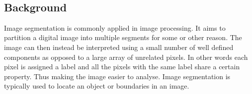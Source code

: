 \documentclass[a4paper,10pt]{article}
\begin{document}
\begin{figure}[H]
\centering
\mbox{ \quad
{} \quad
{}}
\end{figure}


\subsection{Background}
Image segmentation is commonly applied in image processing.  It
aims to partition a digital image into multiple segments for some or other
reason.
The image can then instead be interpreted using a small number of
well defined components as opposed to a large array of unrelated pixels.  
In other words each pixel is assigned a label and all the pixels with the same
label share a certain
property.  Thus making the image easier to analyse. Image segmentation is
typically used to locate an object or boundaries in an image. \\
\end{document}
